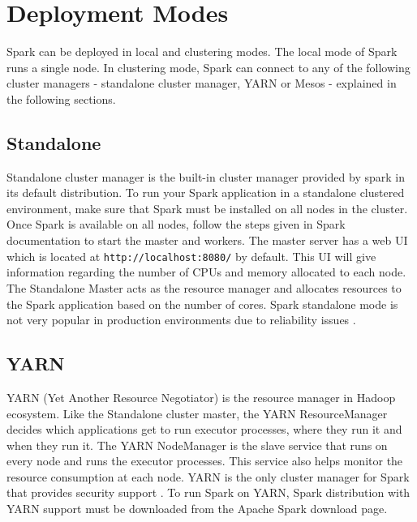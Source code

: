 \documentclass[9pt,twocolumn,twoside]{../../styles/osajnl}
\begin{document}
\section{Deployment Modes}

Spark can be deployed in local and clustering modes. The local mode of
Spark runs a single node. In clustering mode, Spark can connect to any
of the following cluster managers - standalone cluster manager, YARN
or Mesos - explained in the following sections.

\subsection{Standalone}
Standalone cluster manager is the built-in cluster manager provided by
spark in its default distribution. To run your Spark application in a
standalone clustered environment, make sure that Spark must be
installed on all nodes in the cluster. Once Spark is available on all
nodes, follow the steps given in Spark documentation to start the
master and workers. The master server has a web UI which is located at
\texttt{http://localhost:8080/} by default. This UI will give
information regarding the number of CPUs and memory allocated to each
node. The Standalone Master acts as the resource manager and allocates
resources to the Spark application based on the number of cores. Spark
standalone mode is not very popular in production environments due to
reliability issues \cite{www-clusters}.

\subsection{YARN}
YARN (Yet Another Resource Negotiator) is the resource manager in
Hadoop ecosystem. Like the Standalone cluster master, the YARN
ResourceManager decides which applications get to run executor
processes, where they run it and when they run it. The YARN
NodeManager is the slave service that runs on every node and runs the
executor processes. This service also helps monitor the resource
consumption at each node. YARN is the only cluster manager for Spark
that provides security support \cite{www-clusters}. To run Spark on
YARN, Spark distribution with YARN support must be downloaded from the
Apache Spark download page.
\end{document}
